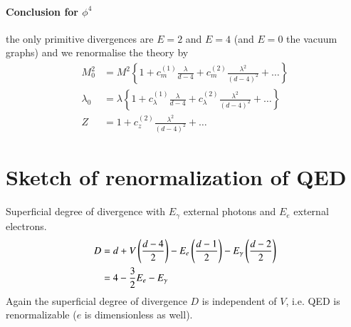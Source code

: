 \paragraph{Conclusion for $\phi^4$}
the only primitive divergences are $E=2$ and $E=4$ (and $E=0$ the vacuum graphs) and we renormalise the theory by  
\begin{align*}
	M_0^2 &= M^2 \left\{ 1 + c_m^{(1)}\frac{\lambda}{d-4} + c_m^{(2)}\frac{\lambda^2}{(d-4)^2} + \dots \right\} \\
	\lambda_0 &= \lambda \left\{ 1 + c_\lambda^{(1)}\frac{\lambda}{d-4} + c_\lambda^{(2)}\frac{\lambda^2}{(d-4)^2} + \dots \right\} \\
	Z &= 1 + c_z^{(2)} \frac{\lambda^2}{(d-4)^2} + \dots
\end{align*}

\section{Sketch of renormalization of QED}
Superficial degree of divergence with $E_\gamma$ external photons and $E_e$ external electrons.
\begin{align}
	D &= d + V \left(\frac{d-4}{2} \right) - E_e \left( \frac{d-1}{2} \right) - E_\gamma \left( \frac{d-2}{2} \right)\notag\\
	  &= 4 - \frac{3}{2}E_e - E_\gamma 
\end{align}
Again the superficial degree of divergence $D$ is independent of $V$, i.e. QED is renormalizable ($e$ is dimensionless as well).

